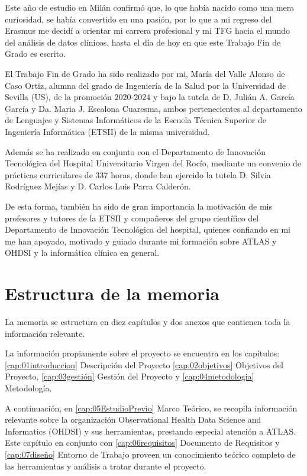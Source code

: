 Este año de estudio en Milán confirmó que, lo que había nacido como una mera curiosidad, se había convertido en una pasión, por lo que a mi regreso del Erasmus me decidí a orientar mi carrera profesional y mi TFG hacia el mundo del análisis de datos clínicos, hasta el día de hoy en que este Trabajo Fin de Grado es escrito.

El Trabajo Fin de Grado ha sido realizado por mi, María del Valle Alonso de Caso Ortiz, alumna del grado de Ingeniería de la Salud por la Universidad de Sevilla (US), de la promoción 2020-2024 y bajo la tutela de D. Julián A. García García y Da. Maria J. Escalona Cuaresma, ambos pertenecientes al departamento de Lenguajes y Sistemas Informáticos de la Escuela Técnica Superior de Ingeniería Informática (ETSII) de la misma universidad. 

Además se ha realizado en conjunto con el Departamento de Innovación Tecnológica del Hospital Universitario Virgen del Rocío, mediante un convenio de prácticas curriculares de 337 horas, donde han ejercido la tutela D. Silvia Rodríguez Mejías y D. Carlos Luis Parra Calderón. 

De esta forma, también ha sido de gran importancia la motivación de mis profesores y tutores de la ETSII y compañeros del grupo científico del Departamento de Innovación Tecnológica del hospital, quienes confiando en mi me han apoyado, motivado y guiado durante mi formación sobre ATLAS y OHDSI y la informática clínica en general.

\section{Estructura de la memoria} \label{sec:01estructura}

La memoria se estructura en diez capítulos y dos anexos que contienen toda la información relevante.

La información propiamente sobre el proyecto se encuentra en los capítulos: \ref{cap:01introduccion} Descripción del Proyecto \ref{cap:02objetivos} Objetivos del Proyecto, \ref{cap:03gestión} Gestión del Proyecto y \ref{cap:04metodologia} Metodología.

A continuación, en \ref{cap:05EstudioPrevio} Marco Teórico, se recopila información relevante sobre la organización Observational Health Data Science and Informatics (OHDSI) y sus herramientas, prestando especial atención a ATLAS. Este capítulo en conjunto con \ref{cap:06requisitos} Documento de Requisitos y \ref{cap:07diseño} Entorno de Trabajo proveen un conocimiento teórico completo de las herramientas y análisis a tratar durante el proyecto. 

